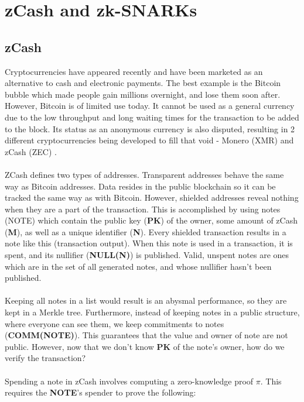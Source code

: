 
\chapter{zCash and zk-SNARKs} %

\label{Chapter3} %


\section{zCash}

Cryptocurrencies have appeared recently and have been marketed as an alternative to cash and electronic payments. The best example is the Bitcoin bubble which made people gain millions overnight, and lose them soon after. However, Bitcoin is of limited use today. It cannot be used as a general currency due to the low throughput and long waiting times for the transaction to be added to the block. Its status as an anonymous currency is also disputed, resulting in 2 different cryptocurrencies being developed to fill that void - Monero (XMR) \cite{monero} and zCash (ZEC) \cite{zcashmain}.\\
\\
ZCash defines two types of addresses. Transparent addresses behave the same way as Bitcoin addresses. Data resides in the public blockchain so it can be tracked the same way as with Bitcoin. However, shielded addresses reveal nothing when they are a part of the transaction. This is accomplished by using notes (NOTE) which contain the public key (\textbf{PK}) of the owner, some amount of zCash (\textbf{M}), as well as a unique identifier (\textbf{N}). Every shielded transaction results in a note like this (transaction output). When this note is used in a transaction, it is spent, and its nullifier (\textbf{NULL(N)}) is published. Valid, unspent notes are ones which are in the set of all generated notes, and whose nullifier hasn't been published.\\
\\
Keeping all notes in a list would result is an abysmal performance, so they are kept in a Merkle tree. Furthermore, instead of keeping notes in a public structure, where everyone can see them, we keep commitments to notes (\textbf{COMM(NOTE)}). This guarantees that the value and owner of note are not public. However, now that we don't know \textbf{PK} of the note's owner, how do we verify the transaction?\\
\\
Spending a note in zCash involves computing a zero-knowledge proof $\pi$. This requires the \textbf{NOTE}'s spender to prove the following:

